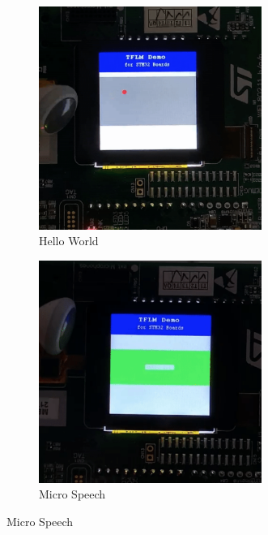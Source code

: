 \documentclass{tum-presentation}
\begin{document}
\begin{frame}
\begin{figure}[h]
     \centering
     \begin{subfigure}[b]{0.3\textwidth}
         \centering
         \includegraphics[width=0.8\textwidth]{figures/hello_world_gif.png}
         \caption{Hello World}
         \label{fig:gif_hello_world}
     \end{subfigure}
     \hfill
     \begin{subfigure}[b]{0.3\textwidth}
         \centering
         \includegraphics[width=0.8\textwidth]{figures/micro_speech_gif.png}
         \caption{Micro Speech}

\end{subfigure}
\end{figure}
\end{frame}
\end{document}
